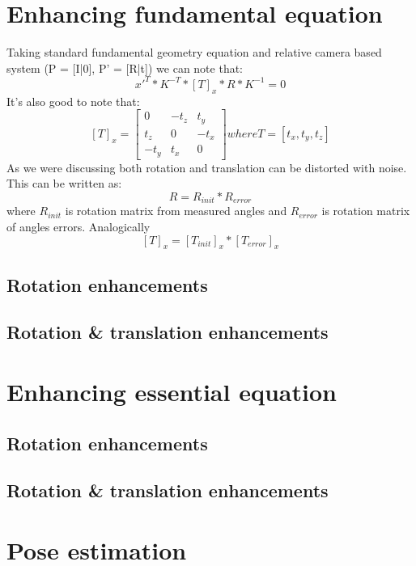 \section{Enhancing fundamental equation}
Taking standard fundamental geometry equation and relative camera based system (P = [I|0], P' = [R|t]) we can note that:
\begin{equation} \label{eq:relativeFundamntal}
{x}'^{T} * K^{-T} * [T]_{x} * R * K^{-1} = 0
\end{equation}
It's also good to note that:
\begin{equation} \label{eq:skewTranslation}
[T]_{x} = \begin{bmatrix} 0 & -t_{z} & t_{y}\\ t_{z} & 0 & -t_{x}\\ -t_{y} & t_{x} & 0 \end{bmatrix} where T = [t_{x},t_{y},t_{z}]
\end{equation}
As we were discussing both rotation and translation can be distorted with noise. This can be written as:
\begin{equation} \label{eq:Rerror}
R = R_{init} * R_{error}
\end{equation}
where $R_{init}$ is rotation matrix from measured angles and $R_{error}$ is rotation matrix of angles errors. Analogically
\begin{equation} \label{eq:TransError}
[T]_{x} = [T_{init}]_{x} * [T_{error}]_{x} 
\end{equation}

\subsection{Rotation enhancements}
\subsection{Rotation \& translation enhancements}
\section{Enhancing essential equation}
\subsection{Rotation enhancements}
\subsection{Rotation \& translation enhancements}
\section{Pose estimation}
